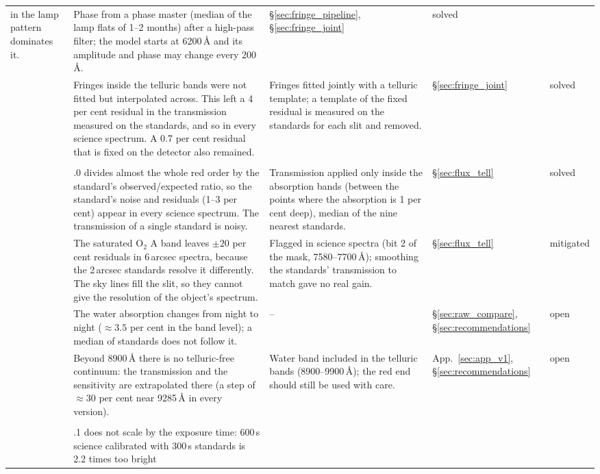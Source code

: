 {\begin{longtable}{@{}>{\raggedright\arraybackslash}p{0.3cm}>{\raggedright\arraybackslash}p{5.4cm}>{\raggedright\arraybackslash}p{5.3cm}>{\raggedright\arraybackslash}p{1.6cm}>{\raggedright\arraybackslash}p{1.9cm}@{}}
in the lamp pattern dominates it. & Phase from a phase master (median of the lamp flats of 1--2
months) after a high-pass filter; the model starts at 6200\,\AA{} and its amplitude and phase may change every
200\,\AA. & \S\ref{sec:fringe_pipeline}, \S\ref{sec:fringe_joint} & solved \\
13 & Fringes inside the telluric bands were not fitted but interpolated across. This left a 4 per cent residual in
the transmission measured on the standards, and so in every science spectrum. A 0.7 per cent residual that is fixed on
the detector also remained. & Fringes fitted jointly with a telluric template; a template of the fixed residual is
measured on the standards for each slit and removed. &
\S\ref{sec:fringe_joint} & solved \\
\midrule
\multicolumn{5}{@{}l}{\textit{Telluric correction}}\\
14 & 1.1.0 divides almost the whole red order by the standard's observed/expected ratio, so the standard's noise and
residuals (1--3 per cent) appear in every science spectrum. The transmission of a single standard is noisy. &
Transmission applied only inside the absorption bands (between the points where the absorption is 1 per cent deep),
median of the nine nearest standards. &
\S\ref{sec:flux_tell} & solved \\
15 & The saturated O$_2$ A band leaves $\pm20$ per cent residuals in 6\,arcsec spectra, because the 2\,arcsec standards
resolve it differently. The sky lines fill the slit, so they cannot give the resolution of the object's spectrum. &
Flagged in science spectra (bit 2 of the mask, 7580--7700\,\AA); smoothing the standards' transmission to match gave
no real gain. & \S\ref{sec:flux_tell} & mitigated \\
16 & The water absorption changes from night to night ($\approx3.5$ per cent in the band level); a median of standards
does not follow it. & -- & \S\ref{sec:raw_compare}, \S\ref{sec:recommendations} & open \\
17 & Beyond 8900\,\AA{} there is no telluric-free continuum: the transmission and the sensitivity are extrapolated
there (a step of $\approx30$ per cent near 9285\,\AA{} in every version). & Water band included in the telluric bands
(8900--9900\,\AA); the red end should still be used with care. & App.~\ref{sec:app_v1}, \S\ref{sec:recommendations} & open \\
\midrule
\multicolumn{5}{@{}l}{\textit{Flux calibration}}\\
18 & 1.0.1 does not scale by the exposure time: 600\,s science calibrated with 300\,s standards is 2.2 times too bright

\end{longtable}}
